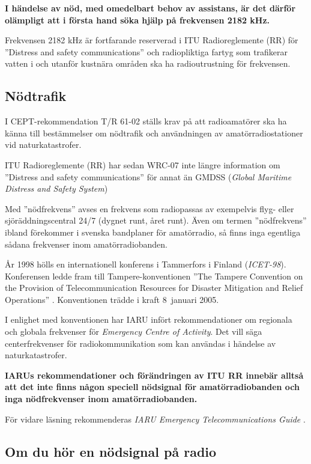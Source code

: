 \textbf{I händelse av nöd, med omedelbart behov av assistans, är det därför
	olämpligt att i första hand söka hjälp på frekvensen 2182 kHz.}

Frekvensen 2182 kHz är fortfarande reserverad i ITU Radioreglemente (RR)
\cite{ITU-RR} för ''Distress and safety communications'' och radiopliktiga
fartyg som trafikerar vatten i och utanför kustnära områden ska ha
radioutrustning för frekvensen.

\subsection{Nödtrafik}
\label{nödtrafik}

I CEPT-rekommendation T/R 61-02 \cite{TR6102} ställs krav på att radioamatörer
ska ha känna till bestämmelser om nödtrafik och användningen av
amatörradiostationer vid naturkatastrofer.

ITU Radioreglemente (RR) \cite{ITU-RR} har sedan WRC-07 inte längre information
om ''Distress and safety communications'' för annat än
GMDSS (\emph{Global Maritime Distress and Safety System})

Med ''nödfrekvens'' avses en frekvens som radiopassas av exempelvis flyg- eller
sjöräddningscentral 24/7 (dygnet runt, året runt).
Även om termen ''nödfrekvens'' ibland förekommer i svenska bandplaner för
amatörradio, så finns inga egentliga sådana frekvenser inom amatörradiobanden.

År 1998 hölls en internationell konferens i Tammerfors i Finland
(\emph{ICET-98}).
Konferensen ledde fram till Tampere-konventionen ''The Tampere Convention on
the Provision of Telecommunication Resources for Disaster Mitigation and Relief
Operations'' \cite{TampereConvention}.
Konventionen trädde i kraft 8~januari 2005.

I enlighet med konventionen har IARU infört rekommendationer om regionala och
globala frekvenser för \emph{Emergency Centre of Activity}.
Det vill säga centerfrekvenser för radiokommunikation som kan användas i
händelse av naturkatastrofer.

\textbf{IARUs rekommendationer och förändringen av ITU RR innebär alltså att
  det inte finns någon speciell nödsignal för amatörradiobanden och inga
  nödfrekvenser inom amatörradiobanden.}

För vidare läsning rekommenderas
\emph{IARU Emergency Telecommunications Guide} \cite{IARU-ETG}.

\subsection{Om du hör en nödsignal på radio}

